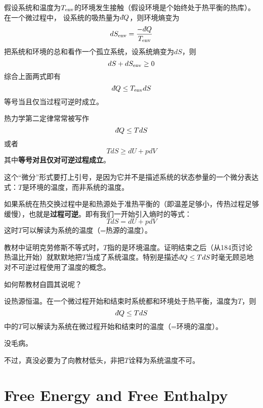 \documentclass[CJK]{beamer}
\begin{document}
\begin{frame}
\bch
假设系统和温度为$T_{\rm env}$的环境发生接触（假设环境是个始终处于热平衡的热库）。在一个微过程中，
设系统的吸热量为$\dbar Q$，则环境熵变为
$$ dS_{\rm env} = \frac{-\dbar Q}{T_{\rm env}}$$
把系统和环境的总和看作一个孤立系统，设系统熵变为$dS$，则
$$dS +dS_{\rm env} \ge 0$$
综合上面两式即有
$$\dbar Q \le T_{\rm env} dS $$
等号当且仅当过程可逆时成立。
\ech
\end{frame}

\begin{frame}
\bch
热力学第二定律常常被写作
{\blue $$\dbar Q \le TdS$$}
或者
{\blue $$ TdS \ge dU + pdV $$}
其中{\bf 等号对且仅对可逆过程成立}。

这个“微分”形式要打上引号，是因为它并不是描述系统的状态参量的一个微分表达式：$T$是环境的温度，而非系统的温度。

如果系统在热交换过程中是和热源处于准热平衡的（即温差足够小，传热过程足够缓慢），也就是{\bf 过程可逆}。即有我们一开始引入熵时的等式：
$$ TdS = dU + pdV$$
这时$T$可以解读为系统的温度（=热源的温度）。
\ech
\end{frame}

\begin{frame}
\bch
{}

教材中证明克劳修斯不等式时，$T$指的是环境温度。证明结束之后（从184页讨论热温比开始）就默默地把$T$当成了系统温度。特别是描述$\dbar Q \le TdS$时毫无顾忌地对不可逆过程使用了温度的概念\wulian。

\skipline

如何帮教材自圆其说呢？

\ech
\end{frame}

\begin{frame}
\bch
设热源恒温。在一个微过程开始和结束时系统都和环境处于热平衡，温度为$T$，则
$$\dbar Q \le TdS $$
中的$T$可以解读为系统在微过程开始和结束时的温度（=环境的温度）。

\skiplines

\bye 没毛病。


不过，真没必要为了向教材低头，非把$T$诠释为系统温度不可。

\ech
\end{frame}

\section{Free Energy and Free Enthalpy}
\end{document}
